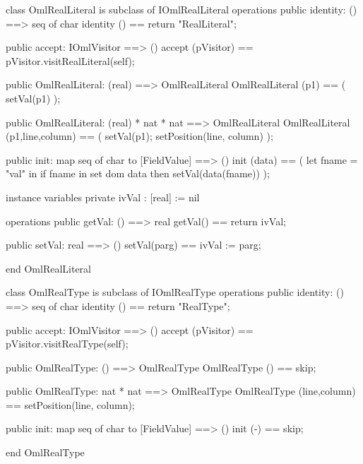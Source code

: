 \begin{vdm_al}
class OmlRealLiteral is subclass of IOmlRealLiteral
operations
  public identity: () ==> seq of char
  identity () == return "RealLiteral";

  public accept: IOmlVisitor ==> ()
  accept (pVisitor) == pVisitor.visitRealLiteral(self);

  public OmlRealLiteral:
    (real) ==> OmlRealLiteral
  OmlRealLiteral (p1) == 
    ( setVal(p1) );

  public OmlRealLiteral:
    (real) *
    nat *
    nat ==> OmlRealLiteral
  OmlRealLiteral (p1,line,column) == 
    ( setVal(p1);
      setPosition(line, column) );

  public init: map seq of char to [FieldValue] ==> ()
  init (data) ==
    ( let fname = "val" in
        if fname in set dom data
        then setVal(data(fname)) );

instance variables
  private ivVal : [real] := nil

operations
  public getVal: () ==> real
  getVal() == return ivVal;

  public setVal: real ==> ()
  setVal(parg) == ivVal := parg;

end OmlRealLiteral
\end{vdm_al}

\begin{vdm_al}
class OmlRealType is subclass of IOmlRealType
operations
  public identity: () ==> seq of char
  identity () == return "RealType";

  public accept: IOmlVisitor ==> ()
  accept (pVisitor) == pVisitor.visitRealType(self);

  public OmlRealType:
    () ==> OmlRealType
  OmlRealType () == 
    skip;

  public OmlRealType:
    nat *
    nat ==> OmlRealType
  OmlRealType (line,column) == 
    setPosition(line, column);

  public init: map seq of char to [FieldValue] ==> ()
  init (-) == skip;

end OmlRealType
\end{vdm_al}

